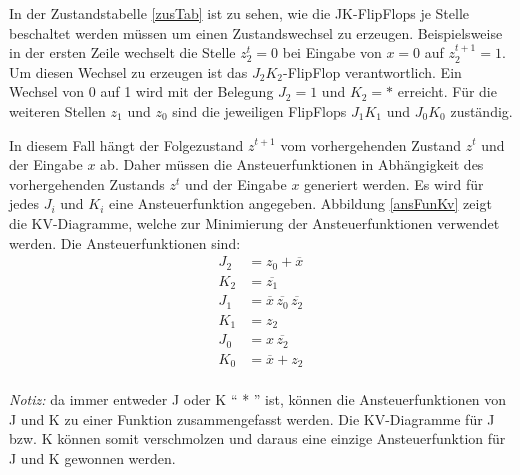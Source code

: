 In der Zustandstabelle \ref{zusTab} ist zu sehen, wie die JK-FlipFlops je Stelle beschaltet werden müssen um einen Zustandswechsel zu erzeugen. Beispielsweise in der ersten Zeile wechselt die Stelle $z_2^t=0$ bei Eingabe von $x=0$ auf $z_2^{t+1}=1$. Um diesen Wechsel zu erzeugen ist das $J_2K_2$-FlipFlop verantwortlich. Ein Wechsel von 0 auf 1 wird mit der Belegung $J_2=1$ und $K_2=*$ erreicht. Für die weiteren Stellen $z_1$ und $z_0$ sind die jeweiligen FlipFlops $J_1K_1$ und $J_0K_0$ zuständig.

In diesem Fall hängt der Folgezustand $z^{t+1}$ vom vorhergehenden Zustand $z^t$ und der Eingabe $x$ ab. Daher müssen die Ansteuerfunktionen in Abhängigkeit des vorhergehenden Zustands $z^t$ und der Eingabe $x$ generiert werden. Es wird für jedes $J_i$ und $K_i$ eine Ansteuerfunktion angegeben. Abbildung \ref{ansFunKv} zeigt die KV-Diagramme, welche zur Minimierung der Ansteuerfunktionen verwendet werden. Die Ansteuerfunktionen sind:
\begin{align*}
	J_2 &= z_0 + \overline{x} \\
	K_2 &= \overline{z_1} \\
	J_1 &= \overline{x}\hspace{2pt}\overline{z_0}\hspace{2pt}\overline{z_2} \\
	K_1 &= z_2 \\ 
	J_0 &= x\hspace{2pt}\overline{z_2} \\
	K_0 &= \overline{x} + z_2 \\ 
\end{align*}


{\sl Notiz:} da immer entweder J oder K "` * "' ist, können die Ansteuerfunktionen von J und K zu einer Funktion zusammengefasst werden. Die KV-Diagramme für J bzw. K können somit verschmolzen und daraus eine einzige Ansteuerfunktion für J und K gewonnen werden.
 


